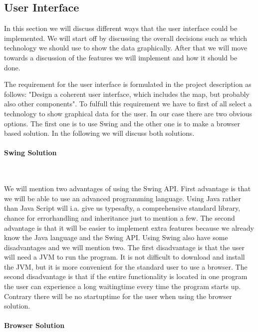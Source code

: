 \documentclass[a4paper,10pt,titlepage]{article}
\begin{document}
			\subsection{User Interface}

				In this section we will discuss different ways that the user interface could be implemented. We will start off by discussing the overall decisions such as which technology we should use to show the data graphically. After that we will move towards a discussion of the features we will implement and how it should be done.  

The requirement for the user interface is formulated in the project description as follows: "Design a coherent user interface, which includes the map, but probably also other components". To fulfull this requirement we have to first of all select a technology to show graphical data for the user. In our case there are two obvious options. The first one is to use Swing and the other one is to make a browser based solution. In the following we will discuss both solutions.

\paragraph{Swing Solution}\mbox{}\

We will mention two advantages of using the Swing API. First advantage is that we will be able to use an advanced programming language. Using Java rather than Java Script will i.a. give us typesafty, a comprehensive standard library, chance for errorhandling and inheritance just to mention a few. The second advantage is that it will be easier to implement extra features because we already know the Java language and the Swing API. Using Swing also have some disadvantages and we will mention two. The first disadvantage is that the user will need a JVM to run the program. It is not difficult to download and install the JVM, but it is more convenient for the standard user to use a browser. The second disadvantage is that if the entire functionality is located in one program the user can experience a long waitingtime every time the program starts up. Contrary there will be no startuptime for the user when using the browser solution. 

\paragraph{Browser Solution}\mbox{}\
\end{document}
